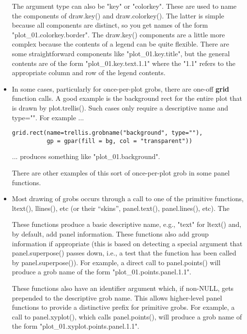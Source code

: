 \documentclass[10pt]{article}
\newcommand{\pkg}[1]{{\bfseries #1}}
\newcommand{\code}[1]{{\ttfamily #1}}
\begin{document}
\begin{itemize}
The argument \code{type} can also be \code{"key"} or \code{"colorkey"}.
These are used to name the components of \code{draw.key()} and
\code{draw.colorkey()}.  The latter is simple because all components
are distinct, so you get names of the form \code{"plot\_01.colorkey.border"}.
The \code{draw.key()} components are a little more complex because
the contents of a legend can be quite flexible.  There are some
straightforward components like \code{"plot\_01.key.title"},
but the general contents are of the form \code{"plot\_01.key.text.1.1"}
where the \code{"1.1"} refers to the appropriate column and row 
of the legend contents.


\item
In some cases, particularly for once-per-plot grobs, there are one-off
\pkg{grid} function calls.  A good example is the background rect for
the entire plot that is drawn by \code{plot.trellis()}.  Such cases 
only require a descriptive name and \code{type=""}.  For example ...

\begin{verbatim}
grid.rect(name=trellis.grobname("background", type=""),
          gp = gpar(fill = bg, col = "transparent"))
\end{verbatim}

... produces something like \code{"plot\_01.background"}.

There are other examples of this sort of once-per-plot grob in
some panel functions.

\item
Most drawing of grobs occurs through a call to one of the primitive
functions, \code{ltext()}, \code{llines()}, etc (or their ``skins'', 
\code{panel.text()}, \code{panel.lines()}, etc).  The 

These functions produce a basic descriptive name, e.g., \code{"text"}
for \code{ltext()} and, by default, add panel information.  
These functions also add
group information if appropriate (this is based on detecting a 
special argument that \code{panel.superpose()} passes down, i.e., 
a test that the function has been called by \code{panel.superpose()}).
For example, a direct call to \code{panel.points()} will produce a grob name
of the form \code{"plot\_01.points.panel.1.1"}.

These functions also 
have an \code{identifier} argument which, if non-\code{NULL},
gets prepended to the descriptive grob name.  This allows higher-level
panel functions to provide a distinctive prefix for primitive grobs.
For example, a call to \code{panel.xyplot()}, which calls 
\code{panel.points()}, will produce a grob name
of the form \code{"plot\_01.xyplot.points.panel.1.1"}.


\end{itemize}
\end{document}
